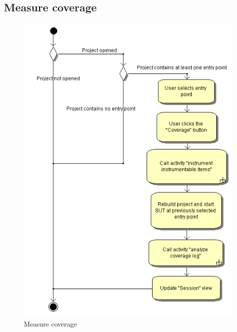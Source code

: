 \subsection{Measure coverage}
\begin{figure}[htb]
 \centering
 \includegraphics[height=0.7\textheight]{images/Activities/measure_coverage.png}
 \caption{Measure coverage}
 \label{ac_fg:measure}
\end{figure}

\clearpage
